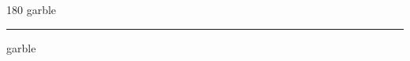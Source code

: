 
\begin{frame}
\begin{center}
\begin{turn}{180}
{\fontsize{2.5cm}{1em}\selectfont garble}
\end{turn}
\vspace{1em}\par  
\hrule
\vspace{1em}\par  
{\fontsize{2.5cm}{1em}\selectfont garble}
\end{center}
\end{frame}
